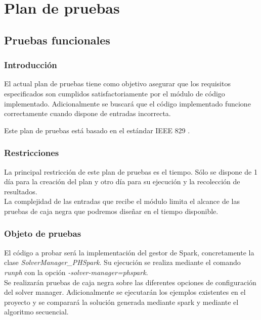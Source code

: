 \chapter{Plan de pruebas}
\label{sec:pruebas}

\section{Pruebas funcionales}

\subsection{Introducción}

El actual plan de pruebas tiene como objetivo asegurar que los requisitos especificados son cumplidos satisfactoriamente por el módulo de código implementado. Adicionalmente se buscará que el código implementado funcione correctamente cuando dispone de entradas incorrecta.

Este plan de pruebas está basado en el estándar IEEE 829 \cite{IEEE829}.

\subsection{Restricciones}

La principal restricción de este plan de pruebas es el tiempo. Sólo se dispone de 1 día para la creación del plan y otro día para su ejecución y la recolección de resultados.\\

La complejidad de las entradas que recibe el módulo limita el alcance de las pruebas de caja negra que podremos diseñar en el tiempo disponible.

\subsection{Objeto de pruebas}

El código a probar será la implementación del gestor de Spark, concretamente la clase {\it SolverManager\_PHSpark}. Su ejecución se realiza mediante el comando {\it runph} con la opción {\it -\-solver-manager=phspark}.\\

Se realizarán pruebas de caja negra sobre las diferentes opciones de configuración del solver manager. Adicionalmente se ejecutarán los ejemplos existentes en el proyecto y se comparará la solución generada mediante spark y mediante el algoritmo secuencial.

